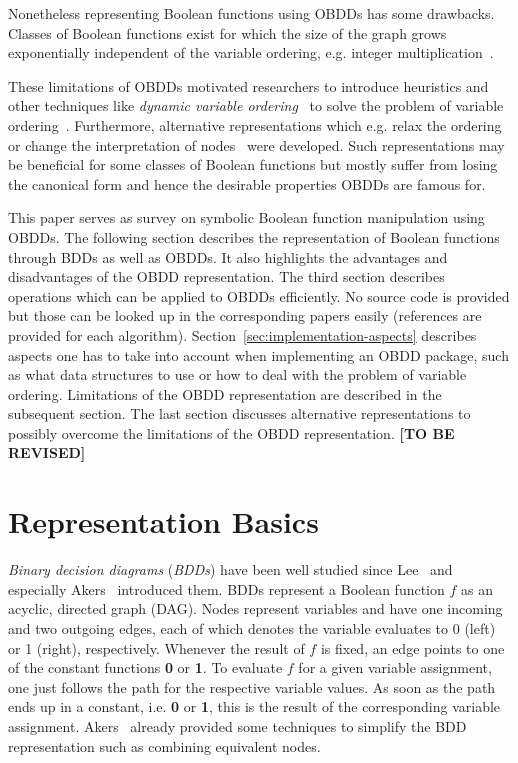 \documentclass{vldb}
\newcommand{\tbr}{\textbf{[TO BE REVISED]}}
\begin{document}
Nonetheless representing Boolean functions using OBDDs has some drawbacks. Classes
of Boolean functions exist for which the size of the graph grows exponentially
independent of the variable ordering, e.g. integer
multiplication~\cite{BRYANT86, BRYANT91, WOELFEL01}.

These limitations of OBDDs motivated researchers to introduce heuristics and
other techniques like \textit{dynamic variable ordering}~\cite{RUDELL93} to solve
the problem of variable ordering~\cite{BOLLIG96}. Furthermore, alternative
representations which e.g. relax the ordering~\cite{BRYANT95} or change the
interpretation of nodes~\cite{BRYANT95, ANDERSEN97} were developed. Such
representations may be beneficial for some classes of Boolean functions but mostly
suffer from losing the canonical form and hence the desirable properties OBDDs
are famous for.

This paper serves as survey on symbolic Boolean function manipulation using OBDDs.
The following section describes the representation of Boolean functions through
BDDs as well as OBDDs. It also highlights the advantages and disadvantages of the
OBDD representation. The third section describes operations which can be applied
to OBDDs efficiently. No source code is provided but those can be looked up in
the corresponding papers easily (references are provided for each algorithm).
Section~\ref{sec:implementation-aspects} describes aspects one has to take into
account when implementing an OBDD package, such as what data structures to use
or how to deal with the problem of variable ordering. Limitations of the OBDD
representation are described in the subsequent section. The last section
discusses alternative representations to possibly overcome the limitations of
the OBDD representation. \tbr

\section{Representation Basics}
\label{sec:representation-basics}

\textit{Binary decision diagrams} (\textit{BDDs}) have been well studied since
Lee~\cite{LEE59} and especially Akers~\cite{AKERS78} introduced them. BDDs
represent a Boolean function $f$ as an acyclic, directed graph (DAG). Nodes
represent variables and have one incoming and two outgoing edges, each of which
denotes the variable evaluates to 0 (left) or 1 (right), respectively. Whenever
the result of $f$ is fixed, an edge points to one of the constant functions
\textbf{0} or \textbf{1}. To evaluate $f$ for a given variable assignment, one
just follows the path for the respective variable values. As soon as the path
ends up in a constant, i.e. \textbf{0} or \textbf{1}, this is the result of the
corresponding variable assignment. Akers~\cite{AKERS78} already provided some
techniques to simplify the BDD representation such as combining equivalent nodes.
\end{document}
